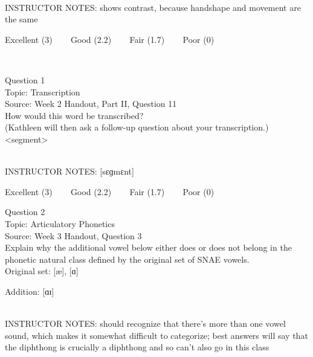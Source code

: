 \documentclass[12pt]{article}
\begin{document}
~\\
INSTRUCTOR NOTES: shows contrast, because handshape and movement are the same


\vfill
Excellent (3) ~~~ Good (2.2) ~~~ Fair (1.7) ~~~ Poor (0)
\newpage

\begin{center}
\textbf{{\color{red}{\HUGE END OF EXAM}}}\\

\end{center}
\newpage

\begin{center}
\textbf{{\color{blue}{\HUGE START OF EXAM\\}}}

\textbf{{\color{blue}{\HUGE Student ID: 78380\\}}}

\textbf{{\color{blue}{\HUGE \\}}}

\end{center}
\newpage

{\large Question 1}\\

Topic: Transcription\\
Source: Week 2 Handout, Part II, Question 11\\

How would this word be transcribed?\\ (Kathleen will then ask a follow-up question about your transcription.)\\

<segment>


~\\
INSTRUCTOR NOTES: [sɛɡmɛnt]


\vfill
Excellent (3) ~~~ Good (2.2) ~~~ Fair (1.7) ~~~ Poor (0)
\newpage

{\large Question 2}\\

Topic: Articulatory Phonetics\\
Source: Week 3 Handout, Question 3\\

Explain why the additional vowel below either does or does not belong in the phonetic natural class defined by the original set of SNAE vowels.\\

Original set: {[æ]}, {[ɑ]}

Addition: {[ɑɪ]}


~\\
INSTRUCTOR NOTES: should recognize that there's more than one vowel sound, which makes it somewhat difficult to categorize; best answers will say that the diphthong is crucially a diphthong and so can't also go in this class
\end{document}
